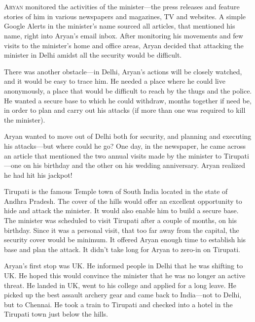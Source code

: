 \chapter{}

\lettrine{A}{ryan} monitored the activities of the minister—the press releases and feature
stories of him in various newspapers and magazines, TV and websites. A simple
Google Alerts in the minister's name sourced all articles, that mentioned his
name, right into Aryan's email inbox. After monitoring his movements and few
visits to the minister's home and office areas, Aryan decided that attacking the
minister in Delhi amidst all the security would be difficult.

There was another obstacle—in Delhi, Aryan's actions will be closely watched,
and it would be easy to trace him. He needed a place where he could live
anonymously, a place that would be difficult to reach by the thugs and the
police. He wanted a secure base to which he could withdraw, months together if
need be, in order to plan and carry out his attacks (if more than one was
required to kill the minister).

Aryan wanted to move out of Delhi both for security, and planning and executing
his attacks—but where could he go? One day, in the newspaper, he came across
an article that mentioned the two annual visits made by the minister to
Tirupati—one on his birthday and the other on his wedding anniversary. Aryan
realized
he had hit his jackpot!

Tirupati is the famous Temple town of South India located in the state of Andhra
Pradesh. The cover of the hills would offer an excellent opportunity to hide and
attack the minister. It would also enable him to build a secure base. The
minister was scheduled to visit Tirupati after a couple of months, on his
birthday. Since it was a personal visit, that too far away from the capital, the
security cover would be minimum. It offered Aryan enough time to establish his
base and plan the attack. It didn't take long for Aryan to zero-in on Tirupati.

Aryan's first stop was UK. He informed people in Delhi that he was shifting to
UK. He hoped this would convince the minister that he was no longer an active
threat. He landed in UK, went to his college and applied for a long leave. He
picked up the best assault archery gear and came back to India—not to Delhi,
but to Chennai. He took a train to Tirupati and checked into a hotel in the
Tirupati town just below the hills.